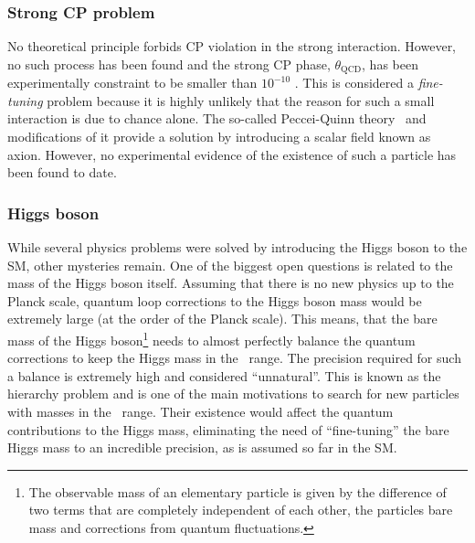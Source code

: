 \subsubsection{Strong CP problem}
No theoretical principle forbids CP violation in the strong interaction. However, no such process has been found and the strong CP phase, $\theta_{\text{QCD}}$, has been experimentally constraint to be smaller than $10^{-10}$ . This is considered a \emph{fine-tuning} problem because it is highly unlikely that the reason for such a small interaction is due to chance alone. 
The so-called Peccei-Quinn theory~\cite{PhysRevLett.38.1440} and modifications of it provide a solution by introducing a scalar field known as axion. However, no experimental evidence of the existence of such a particle has been found to date.




\subsubsection{Higgs boson}
While several physics problems were solved by introducing the Higgs boson to the SM, other mysteries remain. 
One of the biggest open questions is related to the mass of the Higgs boson itself. 
Assuming that there is no new physics up to the Planck scale, quantum loop corrections to the Higgs boson mass would be extremely large (at the order of the Planck scale). 
This means, that the bare mass of the Higgs boson\footnote{The observable mass of an elementary particle is given by the difference of two terms that are completely independent of each other, the particles bare mass and corrections from quantum fluctuations.}
needs to almost perfectly balance the quantum corrections to keep the Higgs mass in the \GeV\ range. The precision required for such a balance is extremely high and considered ``unnatural''. 
This is known as the hierarchy problem and is one of the main motivations to search for new particles with masses in the \TeV\ range. Their existence would affect the quantum contributions to the Higgs mass, eliminating the need of ``fine-tuning'' the bare Higgs mass to an incredible precision, as is assumed so far in the SM. 

